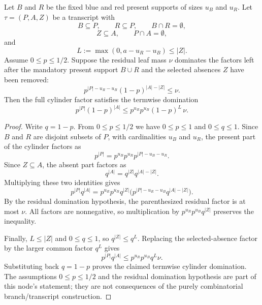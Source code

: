 \begin{helper}
Let \(B\) and \(R\) be the fixed blue and red present supports of sizes
\(u_B\) and \(u_R\).  Let \(\tau=(P,A,Z)\) be a transcript with
\[
B\subseteq P,\qquad R\subseteq P,\qquad B\cap R=\emptyset,
\]
\[
Z\subseteq A,\qquad P\cap A=\emptyset,
\]
and
\[
L:=\max(0,a-u_R-u_B)\le |Z|.
\]
Assume \(0\le p\le1/2\).  Suppose the residual leaf mass \(\nu\) dominates
the factors left after the mandatory present support \(B\cup R\) and the
selected absences \(Z\) have been removed:
\[
p^{|P|-u_R-u_B}(1-p)^{|A|-|Z|}\le \nu .
\]
Then the full cylinder factor satisfies the termwise domination
\[
p^{|P|}(1-p)^{|A|}
\le
p^{u_R}p^{u_B}
(1-p)^L\,\nu .
\]
\end{helper}
\begin{proof}
Write \(q=1-p\).  From \(0\le p\le1/2\) we have \(0\le p\le1\) and
\(0\le q\le1\).  Since \(B\) and \(R\) are disjoint subsets of \(P\), with
cardinalities \(u_B\) and \(u_R\), the present part of the cylinder factors
as
\[
p^{|P|}
=
p^{u_B}p^{u_R}p^{|P|-u_B-u_R}.
\]
Since \(Z\subseteq A\), the absent part factors as
\[
q^{|A|}=q^{|Z|}q^{|A|-|Z|}.
\]
Multiplying these two identities gives
\[
p^{|P|}q^{|A|}
=
p^{u_R}p^{u_B}q^{|Z|}
  \bigl(p^{|P|-u_R-u_B}q^{|A|-|Z|}\bigr).
\]
By the residual domination hypothesis, the parenthesized residual factor is
at most \(\nu\).  All factors are nonnegative, so multiplication by
\(p^{u_R}p^{u_B}q^{|Z|}\) preserves the inequality.

Finally, \(L\le |Z|\) and \(0\le q\le1\), so \(q^{|Z|}\le q^L\).  Replacing
the selected-absence factor by the larger common factor \(q^L\) gives
\[
p^{|P|}q^{|A|}
\le
p^{u_R}p^{u_B}q^L\nu .
\]
Substituting back \(q=1-p\) proves the claimed termwise cylinder
domination.  The assumptions \(0\le p\le1/2\) and the residual domination
hypothesis are part of this node's statement; they are not consequences of
the purely combinatorial branch/transcript construction.
\end{proof}
